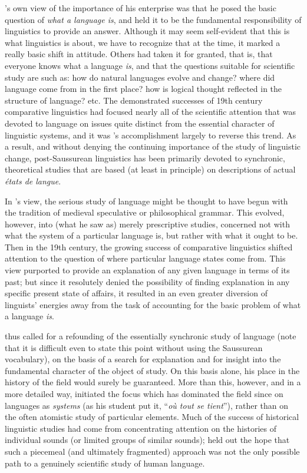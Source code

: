 {\Saussure}'s own view of the importance of his enterprise was that he
posed the basic question of \emph{what a language is}, and held it to
be the fundamental responsibility of linguistics to provide an answer.
Although it may seem self-evident that this is what linguistics is
about, we have to recognize that at the time, it marked a really basic
shift in attitude.  Others had taken it for granted, that is, that
everyone knows what a language \emph{is}, and that the questions
suitable for scientific study are such as: how do natural languages
evolve and change?  where did language come from in the first place?
how is logical thought reflected in the structure of language?  etc.
The demonstrated successes of 19th century comparative linguistics had
focused nearly all of the scientific attention that was devoted to
language on issues quite distinct from the essential character of
linguistic systems, and it was {\Saussure}'s accomplishment largely to
reverse this trend.  As a result, and without denying the continuing
importance of the study of linguistic change, post-Saussurean
linguistics has been primarily devoted to synchronic, theoretical
studies that are based (at least in principle) on descriptions of
actual \emph{états de langue}.

In {\Saussure}'s view, the serious study of language might be thought to
have begun with the tradition of medieval speculative or philosophical
grammar.  This evolved, however, into (what he saw as) merely
prescriptive studies, concerned not with what the system of a
particular language is, but rather with what it ought to be.  Then in
the 19th century, the growing success of comparative linguistics
shifted attention to the question of where particular language states
come from.  This view purported to provide an {explanation} of any given
language in terms of its past; but since it resolutely denied the
possibility of finding {explanation} in any specific present state of
affairs, it resulted in an even greater diversion of linguists'
energies away from the task of accounting for the basic problem of
what a language \emph{is}.

{\Saussure} thus called for a refounding of the essentially synchronic
study of language (note that it is difficult even to state this point
without using the Saussurean vocabulary), on the basis of a search for
{explanation} and for insight into the fundamental character of the
object of study. On this basis alone, his place in the history of the
field would surely be guaranteed.  More than this, however, and in a
more detailed way, {\Saussure} initiated the focus which has dominated
the field since on languages as \emph{systems} (as his student {\Meillet}
put it, ``\emph{où tout se tient}''), rather than on the often
atomistic study of particular elements.  Much of the success of
historical linguistic studies had come from concentrating attention on
the histories of individual sounds (or limited groups of similar
sounds); {\Saussure} held out the hope that such a piecemeal (and
ultimately fragmented) approach was not the only possible path to a
genuinely scientific study of human language.

